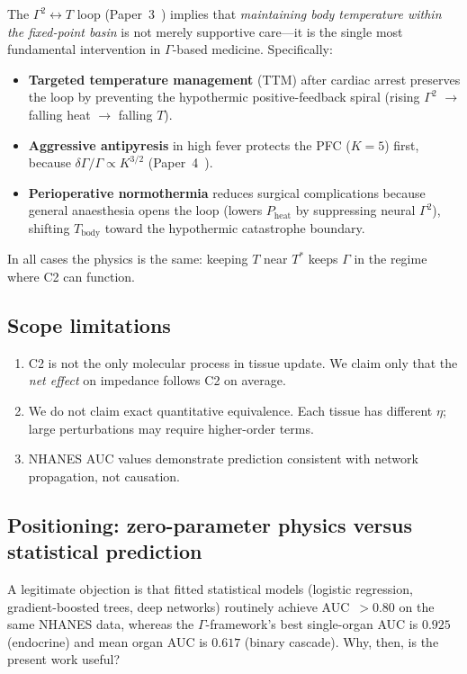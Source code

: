 \documentclass[aps,pre,twocolumn,superscriptaddress,floatfix]{revtex4-2}
\begin{document}
The $\Gamma^2\!\leftrightarrow\!T$ loop
(Paper~3~\cite{Paper3}) implies that \emph{maintaining
body temperature within the fixed-point basin} is not
merely supportive care---it is the single most
fundamental intervention in $\Gamma$-based medicine.
Specifically:
\begin{itemize}
  \item \textbf{Targeted temperature management} (TTM)
    after cardiac arrest preserves the loop by preventing
    the hypothermic positive-feedback spiral
    (rising $\Gamma^2$ $\to$ falling heat $\to$ falling $T$).
  \item \textbf{Aggressive antipyresis} in high fever
    protects the PFC ($K{=}5$) first, because
    $\delta\Gamma/\Gamma \propto K^{3/2}$
    (Paper~4~\cite{Paper4}).
  \item \textbf{Perioperative normothermia} reduces
    surgical complications because general anaesthesia
    opens the loop (lowers $P_{\mathrm{heat}}$ by
    suppressing neural $\Gamma^2$), shifting
    $T_{\mathrm{body}}$ toward the hypothermic
    catastrophe boundary.
\end{itemize}
In all cases the physics is the same: keeping $T$
near $T^*$ keeps $\Gamma$ in the regime where C2 can
function.

\subsection{Scope limitations}
\label{sec:not-claimed}

\begin{enumerate}
  \item C2 is not the only molecular process in tissue update.
    We claim only that the \emph{net effect} on impedance
    follows C2 on average.
  \item We do not claim exact quantitative equivalence.
    Each tissue has different $\eta$; large perturbations
    may require higher-order terms.
  \item NHANES AUC values demonstrate prediction consistent
    with network propagation, not causation.
\end{enumerate}

\subsection{Positioning: zero-parameter physics
  versus statistical prediction}
\label{sec:positioning}

A legitimate objection is that fitted statistical
models (logistic regression, gradient-boosted trees,
deep networks) routinely achieve AUC~$> 0.80$ on the
same NHANES data, whereas the $\Gamma$-framework's
best single-organ AUC is $0.925$ (endocrine) and
mean organ AUC is $0.617$ (binary cascade).
Why, then, is the present work useful?
\end{document}
